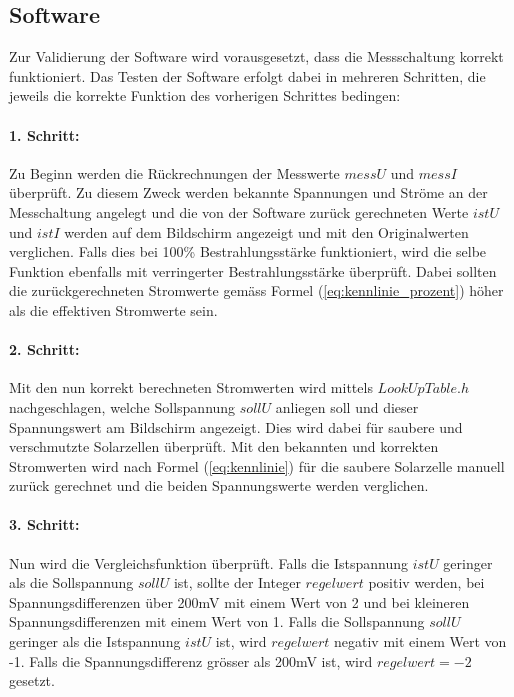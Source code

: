 \subsection{Software}
Zur Validierung der Software wird vorausgesetzt, dass die Messschaltung korrekt funktioniert. Das Testen der Software erfolgt dabei in mehreren Schritten, die jeweils die korrekte Funktion des vorherigen Schrittes bedingen:

\paragraph{1. Schritt:}
Zu Beginn werden die Rückrechnungen der Messwerte $messU$ und $messI$ überprüft. Zu diesem Zweck werden bekannte Spannungen und Ströme an der Messchaltung angelegt und die von der Software zurück gerechneten Werte $istU$ und $istI$ werden auf dem Bildschirm angezeigt und mit den Originalwerten verglichen. Falls dies bei 100\% Bestrahlungsstärke funktioniert, wird die selbe Funktion ebenfalls mit verringerter Bestrahlungsstärke überprüft. Dabei sollten die zurückgerechneten Stromwerte gemäss Formel (\ref{eq:kennlinie_prozent}) höher als die effektiven Stromwerte sein.

\paragraph{2. Schritt:}
Mit den nun korrekt berechneten Stromwerten wird mittels $LookUpTable.h$ nachgeschlagen, welche Sollspannung $sollU$ anliegen soll und dieser Spannungswert am Bildschirm angezeigt. Dies wird dabei für saubere und verschmutzte Solarzellen überprüft. Mit den bekannten und korrekten Stromwerten wird nach Formel (\ref{eq:kennlinie}) für die saubere Solarzelle manuell zurück gerechnet und die beiden Spannungswerte werden verglichen.

\paragraph{3. Schritt:}
Nun wird die Vergleichsfunktion überprüft. Falls die Istspannung $istU$ geringer als die Sollspannung $sollU$ ist, sollte der Integer $regelwert$ positiv werden, bei Spannungsdifferenzen über 200mV mit einem Wert von 2 und bei kleineren Spannungsdifferenzen mit einem Wert von 1. Falls die Sollspannung $sollU$ geringer als die Istspannung $istU$ ist, wird $regelwert$ negativ mit einem Wert von -1. Falls die Spannungsdifferenz grösser als 200mV ist, wird $regelwert=-2$ gesetzt.